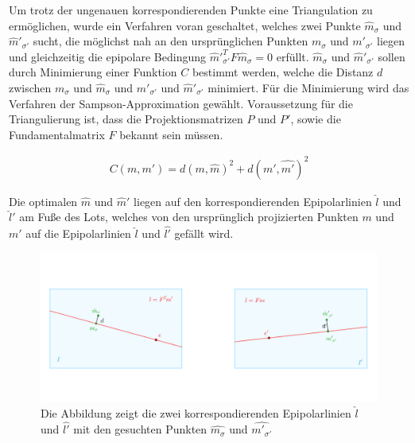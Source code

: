 Um trotz der ungenauen korrespondierenden Punkte eine Triangulation zu ermöglichen, wurde ein Verfahren voran geschaltet, welches zwei Punkte $\hat{m}_\sigma$ und $\hat{m}'_{\sigma'}$ sucht, die möglichst nah an den ursprünglichen Punkten $m_\sigma$ und $m'_{\sigma'}$ liegen und gleichzeitig die epipolare Bedingung $\hat{m}'^T_{\sigma'}F\hat{m}_\sigma = 0$ erfüllt. $\hat{m}_\sigma$ und $\hat{m}'_{\sigma'}$ sollen durch Minimierung einer Funktion $C$ bestimmt werden, welche die Distanz  $d$ zwischen $m_\sigma$ und $\hat{m}_\sigma$ und $m'_{\sigma'}$ und $\hat{m}'_{\sigma'}$ minimiert. Für die Minimierung wird das Verfahren der Sampson-Approximation gewählt\cite{HZ}. Voraussetzung für die Triangulierung ist, dass die Projektionsmatrizen $P$ und $P'$, sowie die Fundamentalmatrix $F$ bekannt sein müssen\cite{HZ}.

\begin{gather}
	C(m,m') = d(m,\hat{m})^2 + d(m',\hat{m'})^2
\end{gather}


Die optimalen $\hat{m}$ und $\hat{m}'$ liegen auf den korrespondierenden Epipolarlinien $\hat{l}$ und $\hat{l}'$ am Fuße des Lots, welches von den ursprünglich projizierten Punkten $m$ und $m'$ auf die Epipolarlinien $\hat{l}$ und $\hat{l'}$ gefällt wird\cite{HZ}. 


\begin{figure}[!htb]
	\centering
	\includegraphics[width=.8\linewidth]{images/SampsAppxNewPoints.png}
	\caption[Sampson Approximation aufstellen der Kostenfunktion]{Die Abbildung zeigt die zwei korrespondierenden Epipolarlinien $\hat{l}$ und $\hat{l'}$ mit den gesuchten Punkten $\hat{m_\sigma}$ und $\hat{m'_{\sigma'}}$}
\end{figure}


